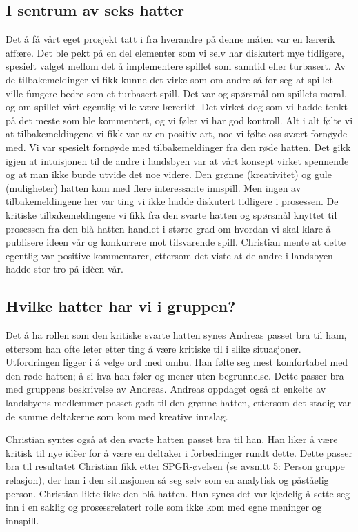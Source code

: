 \subsection{I sentrum av seks hatter}
Det å få vårt eget prosjekt tatt i fra hverandre på denne måten var en lærerik affære. Det ble pekt på en del elementer som vi selv har diskutert mye tidligere, spesielt valget mellom det å implementere spillet som sanntid eller turbasert. Av de tilbakemeldinger vi fikk kunne det virke som om andre så for seg at spillet ville fungere bedre som et turbasert spill. Det var og spørsmål om spillets moral, og om spillet vårt egentlig ville være lærerikt. Det virket dog som vi hadde tenkt på det meste som ble kommentert, og vi føler vi har god kontroll. Alt i alt følte vi at tilbakemeldingene vi fikk var av en positiv art, noe vi følte oss svært fornøyde med. Vi var spesielt fornøyde med tilbakemeldinger fra den røde hatten. Det gikk igjen at intuisjonen til de andre i landsbyen var at vårt konsept virket spennende og at man ikke burde utvide det noe videre. Den grønne (kreativitet) og gule (muligheter) hatten kom med flere interessante innspill. Men ingen av tilbakemeldingene her var ting vi ikke hadde diskutert tidligere i prosessen. De kritiske tilbakemeldingene vi fikk fra den svarte hatten og spørsmål knyttet til prosessen fra den blå hatten handlet i større grad om hvordan vi skal klare å publisere ideen vår og konkurrere mot tilsvarende spill. Christian mente at dette egentlig var positive kommentarer, ettersom det viste at de andre i landsbyen hadde stor tro på idèen vår. 


\subsection{Hvilke hatter har vi i gruppen?}
Det å ha rollen som den kritiske svarte hatten synes Andreas passet bra til ham, ettersom han ofte leter etter ting å være kritiske til i slike situasjoner. Utfordringen ligger i å velge ord med omhu. Han følte seg mest komfortabel med den røde hatten; å si hva han føler og mener uten begrunnelse. Dette passer bra med gruppens beskrivelse av Andreas. Andreas oppdaget også at enkelte av landsbyens medlemmer passet godt til den grønne hatten, ettersom det stadig var de samme deltakerne som kom med kreative innslag.

Christian syntes også at den svarte hatten passet bra til han. Han liker å være kritisk til nye idèer for å være en deltaker i forbedringer rundt dette. Dette passer bra til resultatet Christian fikk etter SPGR-øvelsen (se avsnitt 5: Person gruppe relasjon), der han i den situasjonen så seg selv som en analytisk og påståelig person. Christian likte ikke den blå hatten. Han synes det var kjedelig å sette seg inn i en saklig og prosessrelatert rolle som ikke kom med egne meninger og innspill.

